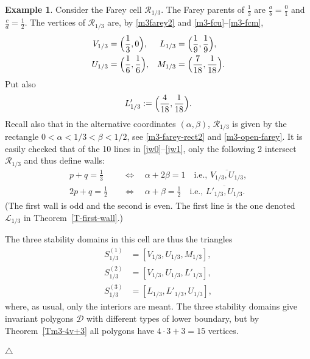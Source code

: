 \documentclass[11pt,reqno,tbtags,a4paper]{amsart}
\numberwithin{equation}{section}
\theoremstyle{plain}%
\theoremstyle{definition}
\newcommand\xqed[1]{%
    \leavevmode\unskip\penalty9999 \hbox{}\nobreak\hfill
    \quad\hbox{#1}}
\newtheorem{exampleqqq}[theorem]{Example}
\newenvironment{example}{\begin{exampleqqq}}
  {\xqed{$\triangle$}\end{exampleqqq}}
\theoremstyle{remark}
\newcommand{\refT}[1]{Theorem~\ref{#1}}
\newcommand\ga{\alpha}
\newcommand\gb{\beta}
\newcommand\cD{\mathcal D}
\newcommand\LL{{\mathcal L}}
\newcommand\cR{{\mathcal R}}
\newcommand\SA{^{(1)}}
\newcommand\SB{^{(2)}}
\newcommand\SC{^{(3)}}
\newcommand\linje[1]{\overline{#1}}
\newcommand\0{{\boldsymbol 0}}
\newcommand\1{{\boldsymbol 1}}
\begin{document}
\begin{example}\label{ER13}
Consider the Farey cell $\cR_{1/3}$. 
The Farey parents of $\frac13$ are $\frac ab=\frac01$ and $\frac cd=\frac 12$.
The vertices of $\cR_{1/3}$ are, by
\eqref{m3farey2} and \eqref{m3-fcu}--\eqref{m3-fcm},
\begin{align}\label{R13}
V_{1/3}&=\Bigl(\frac13,0\Bigr),&
L_{1/3}&=\Bigl(\frac19,\frac19\Bigr),\notag\\
U_{1/3}&=\Bigl(\frac16,\frac16\Bigr),&
M_{1/3}&=\Bigl(\frac7{18},\frac1{18}\Bigr).
\end{align}
Put also
\begin{align}
 L'_{1/3}:=\Bigl(\frac4{18},\frac1{18}\Bigr).
\end{align}
Recall also that in the alternative coordinates $(\ga,\gb)$,
 $\cR_{1/3}$ is given by the rectangle $0<\alpha<1/3<\beta<1/2$, 
see \eqref{m3-farey-rect2} and \eqref{m3-open-farey}.
It is easily checked that of the 10 lines in \eqref{jw0}--\eqref{jw1},
only the following 2 intersect $\cR_{1/3}$ and thus define walls:
%
\begin{align}
p+q=\frac13
 &\quad\Longleftrightarrow\quad 
 \alpha+2\beta=1
 \quad\text{i.e.,  }\linje{V_{1/3},U_{1/3}},\\
2p+q=\frac12
 &\quad\Longleftrightarrow\quad 
 \alpha+\beta=\frac12
 \quad\text{i.e., }\linje{L'_{1/3},U_{1/3}}.
\end{align}
(The first wall is odd and the second is even.
The first line is the one denoted $\LL_{1/3}$ in \refT{T-first-wall}.)

The three stability domains in this cell are thus the triangles
\begin{align}
S_{1/3}\SA&=[V_{1/3},U_{1/3},M_{1/3}],\label{m3-S13SA}\\
S_{1/3}\SB&=[V_{1/3},U_{1/3},L'_{1/3}],\label{m3-S13SB}\\
S_{1/3}\SC&=[L_{1/3},L'_{1/3},U_{1/3}],\label{m3-S13SC}
\end{align}
where, as usual, only the interiors are meant.
The three stability domains give invariant polygons $\cD$ with different
types of lower boundary, 
but by \refT{Tm3-4v+3} all polygons have $4\cdot3+3=15$ vertices.


\end{example}
\end{document}
